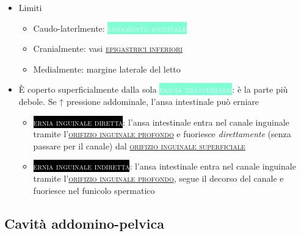 \documentclass[italian,]{article}
\providecommand{\tightlist}{%
  \setlength{\itemsep}{0pt}\setlength{\parskip}{0pt}}
\newcommand{\tol}[1]{\colorbox{Aquamarine}{\textcolor{white}{\textsc{#1}}}}
\newcommand{\pat}[1]{\colorbox{black}{\textcolor{white}{\textsc{#1}}}}
\renewcommand{\a}[1]{\underline{\textsc{#1}}}
\begin{document}
\begin{itemize}
\tightlist
\item
  Limiti

  \begin{itemize}
  \tightlist
  \item
    Caudo-laterlmente: \tol{legamento inguinale}
  \item
    Cranialmente: vasi \a{epigastrici inferiori}
  \item
    Medialmente: margine laterale del letto
  \end{itemize}
\item
  È coperto superficialmente dalla sola \tol{fascia trasversalis}: è la
  parte più debole. Se ↑ pressione addominale, l'ansa intestinale può
  erniare

  \begin{itemize}
  \tightlist
  \item
    \pat{ernia inguinale diretta}: l'ansa intestinale entra nel canale
    inguinale tramite l'\a{orifizio inguinale profondo} e fuoriesce
    \emph{direttamente} (senza passare per il canale) dal
    \a{orifizio inguinale superficiale}
  \item
    \pat{ernia inguinale indiretta}: l'ansa intestinale entra nel canale
    inguinale tramite l'\a{orifizio inguinale profondo}, segue il
    decorso del canale e fuoriesce nel funicolo spermatico
  \end{itemize}
\end{itemize}

\hypertarget{cavituxe0-addomino-pelvica}{%
\subsection{Cavità addomino-pelvica}\label{cavituxe0-addomino-pelvica}}
\end{document}
